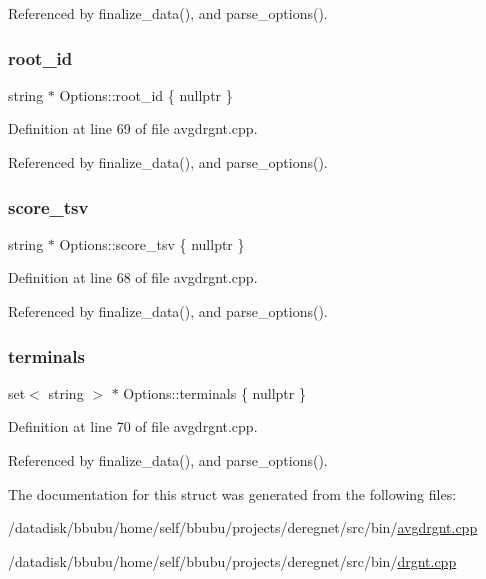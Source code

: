 Referenced by finalize\+\_\+data(), and parse\+\_\+options().

\mbox{\label{structOptions_a7df263753dc02f88a187ed119f3f8c37}} 
\subsubsection{\texorpdfstring{root\+\_\+id}{root\_id}}
{\footnotesize\ttfamily string $\ast$ Options\+::root\+\_\+id \{ nullptr \}}



Definition at line 69 of file avgdrgnt.\+cpp.



Referenced by finalize\+\_\+data(), and parse\+\_\+options().

\mbox{\label{structOptions_a1f2fa7263f58ae203aa79f71b4a26540}} 
\subsubsection{\texorpdfstring{score\+\_\+tsv}{score\_tsv}}
{\footnotesize\ttfamily string $\ast$ Options\+::score\+\_\+tsv \{ nullptr \}}



Definition at line 68 of file avgdrgnt.\+cpp.



Referenced by finalize\+\_\+data(), and parse\+\_\+options().

\mbox{\label{structOptions_a50e99d4f8be4e78eea581ea9378d3b4a}} 
\subsubsection{\texorpdfstring{terminals}{terminals}}
{\footnotesize\ttfamily set$<$ string $>$ $\ast$ Options\+::terminals \{ nullptr \}}



Definition at line 70 of file avgdrgnt.\+cpp.



Referenced by finalize\+\_\+data(), and parse\+\_\+options().



The documentation for this struct was generated from the following files\+:\begin{DoxyCompactItemize}
\item 
/datadisk/bbubu/home/self/bbubu/projects/deregnet/src/bin/\hyperlink{avgdrgnt_8cpp}{avgdrgnt.\+cpp}\item 
/datadisk/bbubu/home/self/bbubu/projects/deregnet/src/bin/\hyperlink{drgnt_8cpp}{drgnt.\+cpp}\end{DoxyCompactItemize}
